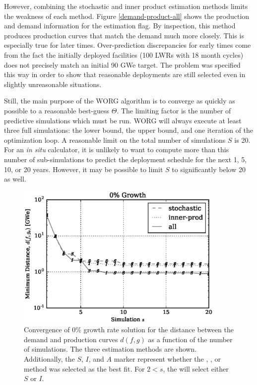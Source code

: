 However, combining the stochastic and inner product estimation methods limits
the weakness of each method. Figure \ref{demand-product-all} shows the
production and demand information for the \allflag estimation flag.
By inspection,
this method produces production curves that match the demand much more
closely. This is especially true for later times. Over-prediction
discrepancies for early times come from the fact the initially deployed
facilities (100 LWRs with 18 month cycles) does not precisely match an
initial 90 GWe target. The problem was specified this way in order to show
that reasonable deployments are still selected even in slightly
unreasonable situations.

Still, the main purpose of the WORG algorithm is to converge as quickly as
possible to a reasonable best-guess $\Theta$. The limiting factor is the
number of
predictive simulations which must be run. WORG will always execute
at least three full simulations: the lower bound, the upper bound, and one
iteration of the optimization loop. A reasonable limit on the total number
of simulations $S$ is 20.  For an \emph{in situ} calculator, it is unlikely
to want to compute more than this number of sub-simulations to predict
the deployment schedule for the next 1, 5, 10, or 20 years. However, it
may be possible to limit $S$ to significantly below 20 as well.

\begin{figure}[htb]
\centering
\includegraphics[width=0.9\textwidth]{converge-0per.eps}
\caption{Convergence of 0\% growth rate solution for the distance between
the demand and production curves $d(f, g)$ as a function of the number of
simulations. The three estimation methods are shown. Additionally, the
$S$, $I$, and $A$ marker represent whether the \stochastic, \innerprod,
or \allflag method was selected as the best fit. For $2 < s$, the \allflag
will select either $S$ or $I$.
}
\label{converge-0per}
\end{figure}


